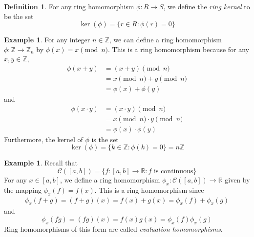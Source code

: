 \documentclass[11pt]{book}
\theoremstyle{definition}\newtheorem{definition}[subsection]{Definition}
\theoremstyle{definition}\newtheorem{example}[subsection]{Example}
\theoremstyle{definition}\newtheorem{notation}[subsection]{Notation}
\theoremstyle{definition}\newtheorem{remark}[subsection]{Remark}
\theoremstyle{theorem}\newtheorem{theorem}[subsection]{Theorem}
\theoremstyle{theorem}\newtheorem{lemma}[subsection]{Lemma}
\theoremstyle{theorem}\newtheorem{proposition}[subsection]{Proposition}
\theoremstyle{theorem}\newtheorem{corollary}[subsection]{Corollary}
\newcommand{\CC}{\mathcal{C}}
\newcommand{\R}{\mathbb{R}}
\newcommand{\Z}{\mathbb{Z}}
\begin{document}
\begin{definition}\label{definition:1.3.2}
    For any ring homomorphism $\phi : R \to S$, we define the \emph{ring kernel} to be the set
    \begin{equation*}
        \ker(\phi) = \{r \in R : \phi(r) = 0\}
    \end{equation*}
\end{definition}

\begin{example}\label{example:1.3.3}
    For any integer $n \in \Z$, we can define a ring homomorphism $\phi : \Z \to \Z_n$ by $\phi(x) = x \pmod n$. This is a ring homomorphism because for any $x, y \in \Z$,
    \begin{align*}
        \phi(x + y) &= (x + y) \pmod n \\
        &= x \pmod n + y \pmod n \\
        &= \phi(x) + \phi(y)
    \end{align*}
    and
    \begin{align*}
        \phi(x \cdot y) &= (x \cdot y) \pmod n \\
        &= x \pmod n \cdot y \pmod n \\
        &= \phi(x) \cdot \phi(y)
    \end{align*}
    Furthermore, the kernel of $\phi$ is the set
    \begin{equation*}
        \ker(\phi) = \{k \in \Z : \phi(k) = 0\} = n\Z
    \end{equation*}
\end{example}

\begin{example}\label{example:1.3.4}
    Recall that
    \begin{equation*}
        \CC([a, b]) = \{f : [a, b] \to \R : \text{$f$ is continuous}\}
    \end{equation*}
    For any $x \in [a, b]$, we define a ring homomorphism $\phi_x : \CC([a, b]) \to \R$ given by the mapping $\phi_x(f) = f(x)$. This is a ring homomorphism since
    \begin{align*}
        \phi_x(f + g) = (f + g)(x) = f(x) + g(x) = \phi_x(f) + \phi_x(g)
    \end{align*}
    and
    \begin{equation*}
        \phi_x(fg) = (fg)(x) = f(x)g(x) = \phi_x(f)\phi_x(g)
    \end{equation*}
    Ring homomorphisms of this form are called \emph{evaluation homomorphisms}.
\end{example}
\end{document}
